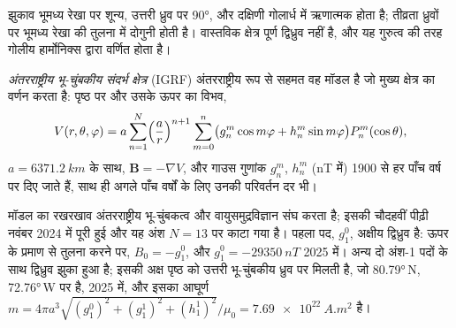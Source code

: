 झुकाव भूमध्य रेखा पर शून्य, उत्तरी ध्रुव पर \ang{90}, और
दक्षिणी गोलार्ध में ऋणात्मक होता है; तीव्रता ध्रुवों पर भूमध्य रेखा की
तुलना में दोगुनी होती है। वास्तविक क्षेत्र पूर्ण द्विध्रुव नहीं है, और यह
गुरुत्व की तरह गोलीय हार्मोनिक्स द्वारा वर्णित होता है।

\begin{definition}[अंतरराष्ट्रीय भू-चुंबकीय संदर्भ क्षेत्र]\label{def:b3:palaeomagnetism:igrf}
\emph{अंतरराष्ट्रीय भू-चुंबकीय संदर्भ क्षेत्र}
(IGRF) अंतरराष्ट्रीय रूप से सहमत वह मॉडल है जो
मुख्य क्षेत्र का वर्णन करता है: पृष्ठ पर और उसके ऊपर का विभव,
\[
  V(r,\theta,\varphi) = a\sum_{n=1}^{N}\Bigl(\frac ar\Bigr)^{n+1}\sum_{m=0}^{n}
  \bigl(g_n^m\cos m\varphi + h_n^m\sin m\varphi\bigr)P_n^m(\cos\theta),
\]
$a = \qty{6371.2}{km}$ के साथ, $\mathbf B = -\nabla V$, और गाउस गुणांक
$g_n^m$, $h_n^m$ (\unit{nT} में) 1900 से हर पाँच वर्ष पर दिए जाते हैं,
साथ ही अगले पाँच वर्षों के लिए उनकी परिवर्तन दर भी।
\end{definition}

मॉडल का रखरखाव अंतरराष्ट्रीय भू-चुंबकत्व और
वायुसमुद्रविज्ञान संघ करता है; इसकी चौदहवीं पीढ़ी नवंबर 2024 में पूरी हुई और यह
अंश $N = 13$ पर काटा गया है। पहला पद, $g_1^0$, अक्षीय द्विध्रुव है:
ऊपर के प्रमाण से तुलना करने पर, $B_0 = -g_1^0$, और $g_1^0 = \qty{-29350}{nT}$
2025 में। अन्य दो अंश-1 पदों के साथ द्विध्रुव झुका हुआ है; इसकी अक्ष
पृष्ठ को उत्तरी भू-चुंबकीय ध्रुव पर मिलती है, जो \ang{80.79}\,N, \ang{72.76}\,W पर है,
2025 में, और इसका आघूर्ण $m = 4\pi a^3\sqrt{(g_1^0)^2 + (g_1^1)^2 +
(h_1^1)^2}/\mu_0 = \qty{7.69e22}{A.m^2}$ है।


